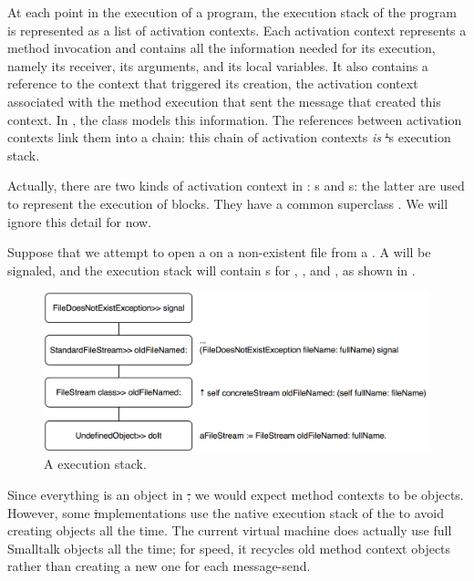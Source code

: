 \documentclass[a4paper,10pt,twoside]{book}
\begin{document}
At each point in the execution of a program, the execution stack of the program is represented as a list of activation contexts. Each activation context represents a method invocation and contains all the information needed for its execution, namely its receiver, its arguments, and its local variables. It also contains a reference to the context that triggered its creation, \ie the activation context associated with the method execution that sent the message that created this context. In \pharo, the class  models this information. 
The references between activation contexts link them into a chain: this chain of activation contexts \emph{is} \st's execution stack.

Actually, there are two kinds of activation context in \pharo: s and s: the latter are used to represent the execution of blocks.  They have a common superclass .  We will ignore this detail for now.

Suppose that we attempt to open a  on a non-existent file from a .
A  will be signaled, and the execution stack will contain s for , , and , as shown in .

\begin{figure}[bth]\centering
        \includegraphics[width=\linewidth]{Stack}
        \caption{A \pharo execution stack.}
\end{figure}

Since everything is an object in \st, we would expect method contexts to be objects.
However, some \st implementations use the native  execution stack of the  to avoid creating objects all the time.
The current \pharo virtual machine does actually use full Smalltalk objects all the time;  for speed, it recycles old method context objects rather than creating a new one for each message-send.
\end{document}
